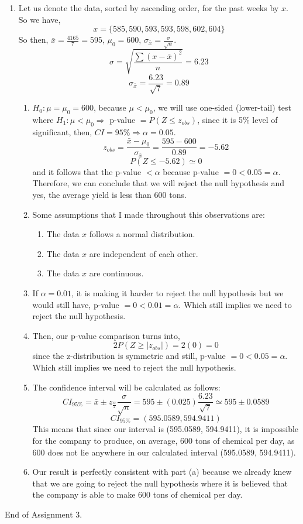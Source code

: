\documentclass[12pt]{article}
\begin{document}
\begin{enumerate}
\begin{proof}
			$\therefore$ We have shown that $X$ and $Y$ are dependent, but they have zero covariance.
		\end{proof}
		\item Let us denote the data, sorted by ascending order, for the past weeks by $x$. So we have, 
		$$x = \{585, 590, 593, 593, 598, 602, 604\}$$
		So then, $\bar{x} = \frac{4165}{7} = 595$, $\mu_0 = 600$, $\sigma_{\bar{x}} = \frac{\sigma}{\sqrt{n}}$.
		$$\sigma = \sqrt{\frac{\sum (x - \bar{x})^2}{n}} = 6.23$$
		$$\sigma_{\bar{x}} = \frac{6.23}{\sqrt{7}} = 0.89$$
		\begin{enumerate}
			\item $H_0 : \mu = \mu_0 = 600$, because $\mu < \mu_0$, we will use one-sided (lower-tail) test where $H_1 : \mu < \mu_0 \Rightarrow$ p-value $= P(Z \leq z_{obs})$, since it is 5\% level of significant, then, $CI = 95\% \Rightarrow \alpha = 0.05$.
				$$z_{obs} = \frac{\bar{x} - \mu_0}{\sigma_{\bar{x}}} = \frac{595 - 600}{0.89} = -5.62$$
				$$P(Z \leq -5.62) \simeq 0$$
				and it follows that the p-value $< \alpha$ because p-value $= 0 < 0.05 = \alpha$. Therefore, we can conclude that we will reject the null hypothesis and yes, the average yield is less than 600 tons.
			\item Some assumptions that I made throughout this observations are:
				\begin{enumerate}
					\item The data $x$ follows a normal distribution.
					\item The data $x$ are independent of each other.
					\item The data $x$ are continuous.
				\end{enumerate}
			\item If $\alpha = 0.01$, it is making it harder to reject the null hypothesis but we would still have, p-value $= 0 < 0.01 = \alpha$. Which still implies we need to reject the null hypothesis.
			\item Then, our p-value comparison turns into,
			$$2P(Z \geq |z_{obs}|) = 2(0) = 0$$
			since the z-distribution is symmetric and still, p-value $= 0 < 0.05 = \alpha$. Which still implies we need to reject the null hypothesis.
			\item The confidence interval will be calculated as follows:
			$$CI_{95\%} = \bar{x} \pm z_{\frac{\alpha}{2}} \frac{\sigma}{\sqrt{n}} = 595 \pm (0.025)\frac{6.23}{\sqrt{7}} \simeq 595 \pm 0.0589$$
			$$CI_{95\%} = (595.0589, 594.9411)$$
			This means that since our interval is (595.0589, 594.9411), it is impossible for the company to produce, on average, 600 tons of chemical per day, as 600 does not lie anywhere in our calculated interval (595.0589, 594.9411).
			\item Our result is perfectly consistent with part (a) because we already knew that we are going to reject the null hypothesis where it is believed that the company is able to make 600 tons of chemical per day.
		\end{enumerate}
\end{enumerate}
End of Assignment 3.
\end{document}
